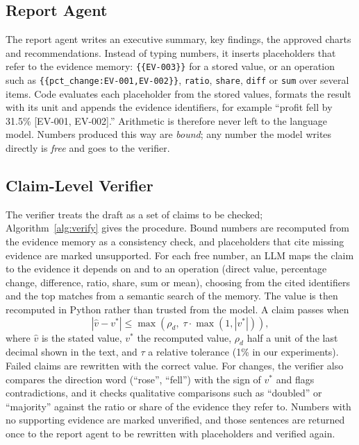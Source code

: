 \documentclass[conference]{IEEEtran}
\begin{document}
\subsection{Report Agent}
The report agent writes an executive summary, key findings, the approved charts and recommendations. Instead of typing numbers, it inserts placeholders that refer to the evidence memory: \texttt{\{\{EV-003\}\}} for a stored value, or an operation such as \texttt{\{\{pct\_change:EV-001,EV-002\}\}}, \texttt{ratio}, \texttt{share}, \texttt{diff} or \texttt{sum} over several items. Code evaluates each placeholder from the stored values, formats the result with its unit and appends the evidence identifiers, for example ``profit fell by 31.5\% [EV-001, EV-002].'' Arithmetic is therefore never left to the language model. Numbers produced this way are \emph{bound}; any number the model writes directly is \emph{free} and goes to the verifier.

\subsection{Claim-Level Verifier}
The verifier treats the draft as a set of claims to be checked; Algorithm~\ref{alg:verify} gives the procedure. Bound numbers are recomputed from the evidence memory as a consistency check, and placeholders that cite missing evidence are marked unsupported. For each free number, an LLM maps the claim to the evidence it depends on and to an operation (direct value, percentage change, difference, ratio, share, sum or mean), choosing from the cited identifiers and the top matches from a semantic search of the memory. The value is then recomputed in Python rather than trusted from the model. A claim passes when
\begin{equation}
\left| \hat{v} - v^{*} \right| \le \max\!\left(\rho_d,\; \tau \cdot \max\left(1, |v^{*}|\right)\right),
\end{equation}
where $\hat{v}$ is the stated value, $v^{*}$ the recomputed value, $\rho_d$ half a unit of the last decimal shown in the text, and $\tau$ a relative tolerance (1\% in our experiments). Failed claims are rewritten with the correct value. For changes, the verifier also compares the direction word (``rose'', ``fell'') with the sign of $v^{*}$ and flags contradictions, and it checks qualitative comparisons such as ``doubled'' or ``majority'' against the ratio or share of the evidence they refer to. Numbers with no supporting evidence are marked unverified, and those sentences are returned once to the report agent to be rewritten with placeholders and verified again.
\end{document}
